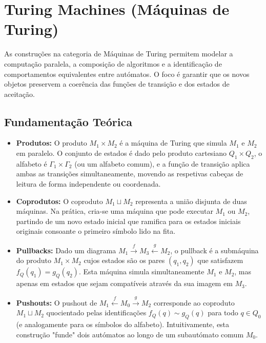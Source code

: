 \section{Turing Machines (Máquinas de Turing)}
\label{sec:const-turing}

As construções na categoria de Máquinas de Turing permitem modelar a computação paralela, a composição de algoritmos e a identificação de comportamentos equivalentes entre autómatos. O foco é garantir que os novos objetos preservem a coerência das funções de transição e dos estados de aceitação.

\subsection{Fundamentação Teórica}

\begin{itemize}
    \item \textbf{Produtos:} O produto $M_1 \times M_2$ é a máquina de Turing que simula $M_1$ e $M_2$ em paralelo. O conjunto de estados é dado pelo produto cartesiano $Q_1 \times Q_2$, o alfabeto é $\Gamma_1 \times \Gamma_2$ (ou um alfabeto comum), e a função de transição aplica ambas as transições simultaneamente, movendo as respetivas cabeças de leitura de forma independente ou coordenada.
    
    \item \textbf{Coprodutos:} O coproduto $M_1 \sqcup M_2$ representa a união disjunta de duas máquinas. Na prática, cria-se uma máquina que pode executar $M_1$ ou $M_2$, partindo de um novo estado inicial que ramifica para os estados iniciais originais consoante o primeiro símbolo lido na fita.

    \item \textbf{Pullbacks:} Dado um diagrama $M_1 \xrightarrow{f} M_3 \xleftarrow{g} M_2$, o pullback é a submáquina do produto $M_1 \times M_2$ cujos estados são os pares $(q_1, q_2)$ que satisfazem $f_Q(q_1) = g_Q(q_2)$. Esta máquina simula simultaneamente $M_1$ e $M_2$, mas apenas em estados que sejam compatíveis através da sua imagem em $M_3$.

    \item \textbf{Pushouts:} O pushout de $M_1 \xleftarrow{f} M_0 \xrightarrow{g} M_2$ corresponde ao coproduto $M_1 \sqcup M_2$ quocientado pelas identificações $f_Q(q) \sim g_Q(q)$ para todo $q \in Q_0$ (e analogamente para os símbolos do alfabeto). Intuitivamente, esta construção "funde" dois autómatos ao longo de um subautómato comum $M_0$.


\end{itemize}
